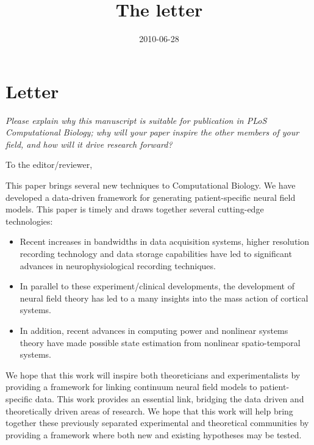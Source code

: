 \documentclass[]{article}
\title{The letter}
\author{  }
\date{2010-06-28}
\begin{document}
\ifpdf
{}
\else
{}
\fi

\maketitle


\section{Letter}
\emph{Please explain why this manuscript is suitable for publication in PLoS Computational Biology; why will your paper inspire the other members of your field, and how will it drive research forward?}


To the editor/reviewer,

This paper brings several new techniques to Computational Biology. We have developed a data-driven framework for generating patient-specific neural field models. This paper is timely and draws together several cutting-edge technologies:
\begin{itemize}
	\item Recent increases in bandwidths in data acquisition systems, higher resolution recording technology and data storage capabilities have led to significant advances in neurophysiological recording techniques. 
	\item In parallel to these experiment/clinical developments, the development of neural field theory has led to a many insights into the mass action of cortical systems. 
	\item In addition, recent advances in computing power and nonlinear systems theory have made possible state estimation from nonlinear spatio-temporal systems.
\end{itemize}

We hope that this work will inspire both theoreticians and experimentalists by providing a framework for linking continuum neural field models to patient-specific data. This work provides an essential link, bridging the data driven and theoretically driven areas of research. We hope that this work will help bring together these previously separated experimental and theoretical communities by providing a framework where both new and existing hypotheses may be tested.
\end{document}
